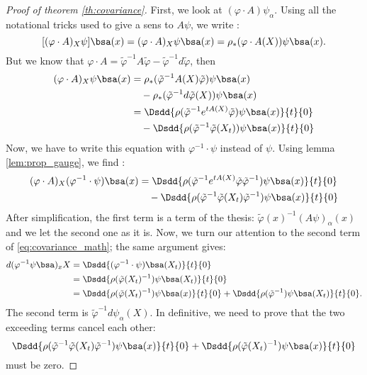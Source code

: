 \begin{proof}[Proof of theorem \ref{th:covariance}]
First, we look at $(\varphi\cdot A)\psi_{\alpha}$. Using all the notational tricks used to give a sens to $A\psi$, we write :
\[
   [(\varphi\cdot A)_X\psi]\bsa(x)=(\varphi\cdot A)_X\psi\bsa(x)=\rho_*(\varphi\cdot A(X))\psi\bsa(x).
\]
But we know that $\varphi\cdot A=\tilde{\varphi}^{-1} A\tilde{\varphi}-\tilde{\varphi}^{-1} d\tilde{\varphi}$, then
\begin{equation}\label{eq:en_deux}
\begin{split}
  (\varphi\cdot A)_X\psi\bsa(x)
  &=\rho_*(\tilde{\varphi}^{-1} A(X)\tilde{\varphi})\psi\bsa(x)\\
  &\quad-\rho_*(\tilde{\varphi}^{-1} d\tilde{\varphi}(X))\psi\bsa(x)\\
  &=\Dsdd{ \rho(\tilde{\varphi}^{-1} e^{tA(X)}\tilde{\varphi})\psi\bsa(x)}{t}{0}\\
 &\quad-\Dsdd{ \rho(\tilde{\varphi}^{-1}\tilde{\varphi}(X_t))\psi\bsa(x) }{t}{0}
\end{split}
\end{equation}
Now, we have to write this equation with $\varphi^{-1}\cdot\psi$ instead of $\psi$. Using lemma \ref{lem:prop_gauge}, we find :
\begin{equation}
\begin{split}
   (\varphi\cdot A)_X(\varphi^{-1}\cdot\psi)\bsa(x)
   &=\Dsdd{ \rho(\tilde{\varphi}^{-1} e^{tA(X)}\tilde{\varphi}\tilde{\varphi}^{-1})\psi\bsa(x)}{t}{0}\\
   &\quad-\Dsdd{ \rho(\tilde{\varphi}^{-1}\tilde{\varphi}(X_t)\tilde{\varphi}^{-1})\psi\bsa(x) }{t}{0}
\end{split}
\end{equation}
After simplification, the first term is a term of the thesis: $\tilde{\varphi}(x)^{-1}(A\psi)_{\alpha}(x)$ and we let the second one as it is. Now, we turn our attention to the second term of \eqref{eq:covariance_math}; the same argument gives:
\begin{equation}
\begin{split}
  d(\varphi^{-1}\psi\bsa)_xX
  &=\Dsdd{(\varphi^{-1}\cdot\psi)\bsa(X_t)}{t}{0}\\
  &=\Dsdd{\rho(\tilde{\varphi}(X_t)^{-1})\psi\bsa(X_t)}{t}{0}\\
  &=\Dsdd{\rho(\tilde{\varphi}(X_t)^{-1})\psi\bsa(x)}{t}{0}
  +\Dsdd{\rho(\tilde{\varphi}^{-1})\psi\bsa(X_t)}{t}{0}.
\end{split}
\end{equation}
The second term is $\tilde{\varphi}^{-1} d\psi_{\alpha}(X)$. In definitive, we need to prove that the two exceeding terms cancel each other:
\begin{equation}\label{eq:le_zero}
  \Dsdd{\rho(\tilde{\varphi}^{-1}\tilde{\varphi}(X_t)\tilde{\varphi}^{-1})\psi\bsa(x)}{t}{0}
  +\Dsdd{\rho(\tilde{\varphi}(X_t)^{-1})\psi\bsa(x)}{t}{0}
\end{equation}
must be zero.


\end{proof}
